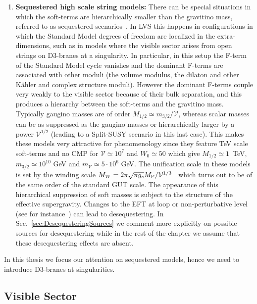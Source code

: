 \documentclass[12pt,a4paper]{book}
\begin{document}
\begin{enumerate}
\item{\bf Sequestered high scale string models:}
There can be special situations in which the soft-terms are hierarchically smaller than the gravitino mass, referred to as sequestered scenarios~\cite{Blumenhagen:2009gk}. In LVS this happens in configurations in which the Standard Model degrees of freedom are localized in the extra-dimensions, such as in models where the visible sector arises from open strings on D3-branes at a singularity. In particular, in this setup the F-term of the Standard Model cycle vanishes and the dominant F-terms are associated with other moduli (the volume modulus, the dilaton and other K\"ahler and complex structure moduli).
However the dominant F-terms couple very weakly to the visible sector because of their bulk separation, and this produces a hierarchy between the soft-terms and the gravitino mass. Typically gaugino masses are of order $M_{1/2}\simeq m_{3/2}/\mathcal{V}$, whereas scalar masses can be as suppressed as the gaugino masses or hierarchically larger by a power $\mathcal{V}^{1/2}$ (leading to a Split-SUSY scenario in this last case). This makes these models very attractive for phenomenology since they feature TeV scale soft-terms and no CMP for $\mathcal{V}\simeq 10^7$ and $W_0\simeq 50$ which give
$M_{1/2}\simeq 1$~TeV, $m_{3/2}\simeq 10^{10}$ GeV and $m_\mathcal{V} \simeq 5\cdot 10^6$ GeV. The unification scale in these models is set by the winding scale $M_W = 2 \pi\sqrt{\pi g_s} M_{\rm P} / \mathcal{V}^{1/3}$~\cite{Conlon:2009xf,Conlon:2009kt} which turns out to be of the same order of the standard GUT scale. The appearance of this hierarchical suppression of soft masses is subject to the structure of the effective supergravity. Changes to the EFT at loop or non-perturbative level (see for instance~\cite{Conlon:2010ji,Choi:2010gm, Berg:2010ha, Conlon:2011jq,Berg:2012aq}) can lead to desequestering. In Sec.~\ref{sec:DesequesteringSources} we comment more explicitly on possible sources for desequestering while in the rest of the chapter we assume that these desequestering effects are absent.
\end{enumerate}

In this thesis we focus our attention on sequestered models, hence we need to introduce D3-branes at singularities.

\subsection{Visible Sector}
\label{ssec:VisibleSector}
\end{document}
